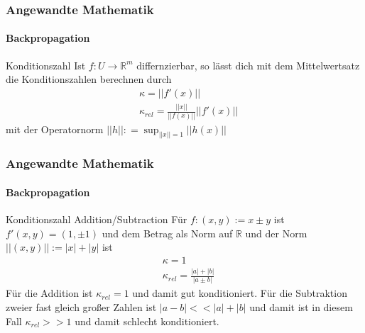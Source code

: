 \documentclass{beamer}
\begin{document}
\begin{frame}
    \frametitle{Angewandte Mathematik}
\framesubtitle{Backpropagation}
    \begin{block}{Konditionszahl}
Ist $f : U \to \mathbb{R}^m$ differnzierbar, so lässt dich mit dem Mittelwertsatz die Konditionszahlen berechnen durch
\begin{align*}
& \kappa = || f'(x) || \\
& \kappa_{rel} = \frac{||x||}{|| f(x)||} ||f'(x) ||
\end{align*}
mit der Operatornorm 
$||h|| : = \sup_{||x|| =  1} ||h(x)||$

\end{block}
 \end{frame}

\begin{frame}
    \frametitle{Angewandte Mathematik}
\framesubtitle{Backpropagation}
    \begin{block}{Konditionszahl Addition/Subtraction}
Für $f:(x,y):= x \pm y$ ist $f'(x,y) = (1,\pm 1)$ und dem Betrag als Norm auf $\mathbb{R}$  und der Norm $||(x,y)|| := |x| + |y|$ ist 
\begin{align*}
& \kappa = 1 \\
& \kappa_{rel} = \frac{|a| + |b| }{|a \pm b|}
\end{align*}
Für die Addition ist  $\kappa_{rel} = 1$ und damit gut konditioniert.
Für die Subtraktion zweier fast gleich großer Zahlen ist $|a - b| << |a| + |b|$ und damit ist in diesem Fall $\kappa_{rel} >> 1$ und damit schlecht konditioniert. 
\end{block}
 \end{frame}
\end{document}
